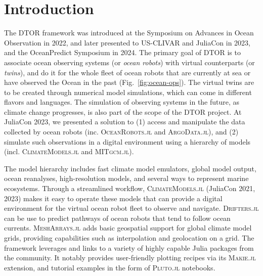 \documentclass{juliacon}[12pt]
\newcommand{\pkg}[1]{{\small \textsc{#1}}}
\begin{document}
\section{Introduction}

The DTOR framework was introduced at the Symposium on Advances in Ocean Observation in 2022, and later presented to US-CLIVAR and JuliaCon in 2023, and the OceanPredict Symposium in 2024. The primary goal of DTOR is to associate ocean observing systems (or {\it ocean robots}) with virtual counterparts (or {\it twins}), and do it for the whole fleet of ocean robots that are currently at sea or have observed the Ocean in the past (Fig.~\ref{fig:ocean-ops}). The virtual twins are to be created through numerical model simulations, which can come in different flavors and languages. The simulation of observing systems in the future, as climate change progresses, is also part of the scope of the DTOR project. At JuliaCon 2023, we presented a solution to (1) access and manipulate the data collected by ocean robots (inc. \pkg{OceanRobots.jl} and \pkg{ArgoData.jl}), and (2) simulate such observations in a digital environment using a hierarchy of models (incl. \pkg{ClimateModels.jl} and \pkg{MITgcm.jl}).

The model hierarchy includes fast climate model emulators, global model output, ocean reanalyses, high-resolution models, and several ways to represent marine ecosystems. Through a streamlined workflow, \pkg{ClimateModels.jl} (JuliaCon 2021, 2023) makes it easy to operate these models that can provide a digital environment for the virtual ocean robot fleet to observe and navigate. \pkg{Drifters.jl} \cite{Forget2021} can be use to predict pathways of ocean robots that tend to follow ocean currents. \pkg{MeshArrays.jl} adds basic geospatial support for global climate model grids, providing capabilities such as interpolation and geolocation on a grid. The framework leverages and links to a variety of highly capable Julia packages from the community. It notably provides user-friendly plotting recipes via its \pkg{Makie.jl} extension, and tutorial examples in the form of \pkg{Pluto.jl} notebooks.
\end{document}
